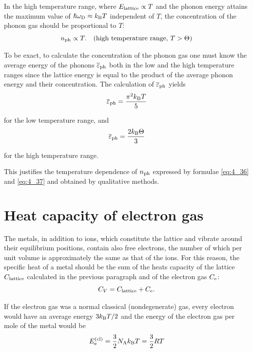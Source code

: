 In the high temperature range, where $E_{\text{lattice}}\propto T$ and the phonon energy attains the maximum value of $\hslash\omega_{\text{D}}\approx k_{\text{B}}T$ independent of $T$, the concentration of the phonon gas should be proportional to $T$:
\begin{equation}\label{eq:4_37}
    n_{\text{ph}} \propto T.\quad \text{(high temperature range, $T>\Theta$)}
\end{equation}

To be exact, to calculate the concentration of the phonon gas one must know the average energy of the phonons $\overline{\varepsilon}_{\text{ph}}$ both in the low and the high temperature ranges since the lattice energy is equal to the product of the average phonon energy and their concentration. The calculation of $\overline{\varepsilon}_{\text{ph}}$ yields
\begin{equation}\label{eq:4_38}
    \overline{\varepsilon}_{\text{ph}} = \frac{\pi^2k_{\text{B}}T}{5}
\end{equation}

\noindent
for the low temperature range, and
\begin{equation}\label{eq:4_39}
    \overline{\varepsilon}_{\text{ph}} = \frac{2k_{\text{B}}\Theta}{3}
\end{equation}

\noindent
for the high temperature range.

This justifies the temperature dependence of $n_{\text{ph}}$ expressed by formulae \eqref{eq:4_36} and \eqref{eq:4_37} and obtained by qualitative methods.

\section{Heat capacity of electron gas}\label{sec:34}

The metals, in addition to ions, which constitute the lattice and vibrate around their equilibrium positions, contain also free electrons, the number of which per unit volume is approximately the same as that of the ions. For this reason, the specific heat of a metal should be the sum of the heats capacity of the lattice $C_{\text{lattice}}$ calculated in the previous paragraph and of the electron gas $C_{\text{e}}$:
\begin{equation*}
    C_V = C_{\text{lattice}} + C_{\text{e}}.
\end{equation*}

If the electron gas was a normal classical (nondegenerate) gas, every electron would have an average energy $3k_{\text{B}}T/2$ and the energy of the electron gas per mole of the metal would be
\begin{equation*}
    E_{\text{e}}^{\text{(cl)}} = \frac{3}{2} N_{\text{A}} k_{\text{B}} T = \frac{3}{2} RT
\end{equation*}

